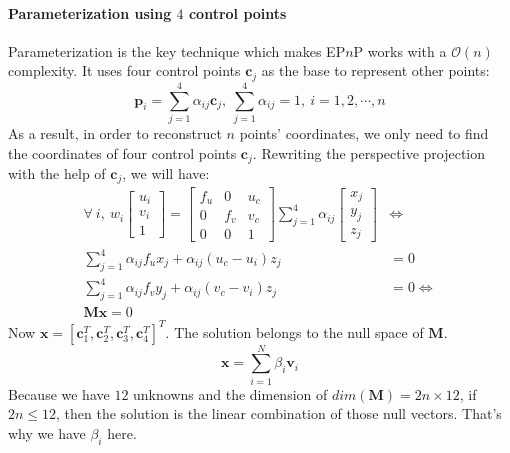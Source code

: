 \documentclass[a4paper]{report}
\begin{document}
\paragraph{Parameterization using $4$ control points}
Parameterization is the key technique which makes EP$n$P works with a $\mathcal{O}(n)$ complexity. It uses four control points $\mathbf{c}_j$ as the base to represent other points:
$$
\mathbf{p}_i=\sum_{j=1}^{4}\alpha_{ij}\mathbf{c}_j,\ \sum_{j=1}^{4}\alpha_{ij}=1,\ i=1,2,\cdots,n
$$
As a result, in order to reconstruct $n$ points' coordinates, we only need to find the coordinates of four control points $\mathbf{c}_j$. Rewriting the perspective projection with the help of $\mathbf{c}_j$, we will have:
\begin{align*}
\forall\ i,\ w_i\left[ \begin{matrix}
u_i \\ v_i \\ 1
\end{matrix} \right]=\left[
\begin{matrix}
f_u & 0 & u_c \\
0 & f_v & v_c \\
0 & 0 & 1
\end{matrix}
\right]
\sum_{j=1}^{4}\alpha_{ij}\left[
\begin{matrix}
x_j \\ y_j \\ z_j
\end{matrix}
\right] &\Leftrightarrow \\
\sum_{j=1}^{4}\alpha_{ij}f_ux_j+\alpha_{ij}(u_c-u_i)z_j&=0 \\
\sum_{j=1}^{4}\alpha_{ij}f_vy_j+\alpha_{ij}(v_c-v_i)z_j&=0 \Leftrightarrow \\
\mathbf{M}\mathbf{x}=0
\end{align*}
Now $\mathbf{x}=[\mathbf{c}_1^T,\mathbf{c}_2^T,\mathbf{c}_3^T,\mathbf{c}_4^T]^T$. The solution belongs to the null space of $\mathbf{M}$. 
$$
\mathbf{x}=\sum_{i=1}^{N}\beta_i \mathbf{v}_i
$$
Because we have $12$ unknowns and the dimension of $dim(\mathbf{M})=2n \times 12$, if $2n \leq 12$, then the solution is the linear combination of those null vectors. That's why we have $\beta_i$ here.
\end{document}
